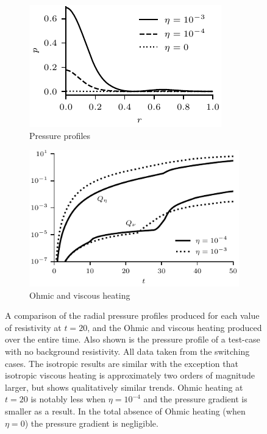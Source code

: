 \begin{figure}[t]
  \centering
    \begin{subfigure}{0.49\textwidth}
      \includegraphics[width=\linewidth]{pressure_profiles.pdf}
      \caption{Pressure profiles}
      \label{fig:pressure_profiles}
    \end{subfigure}
    \hfill
    \begin{subfigure}{0.49\textwidth}
      \includegraphics[width=\linewidth]{heating.pdf}
      \caption{Ohmic and viscous heating}
      \label{fig:kink_straight_heating}
    \end{subfigure}
  \caption{A comparison of the radial pressure profiles produced for each value of resistivity at $t=20$, and the Ohmic and viscous heating produced over the entire time. Also shown is the pressure profile of a test-case with no background resistivity. All data taken from the switching cases. The isotropic results are similar with the exception that isotropic viscous heating is approximately two orders of magnitude larger, but shows qualitatively similar trends. Ohmic heating at $t=20$ is notably less when $\eta=10^{-4}$ and the pressure gradient is smaller as a result. In the total absence of Ohmic heating (when $\eta=0$) the pressure gradient is negligible.}%
  \label{fig:pressure_and_heating}
\end{figure}

